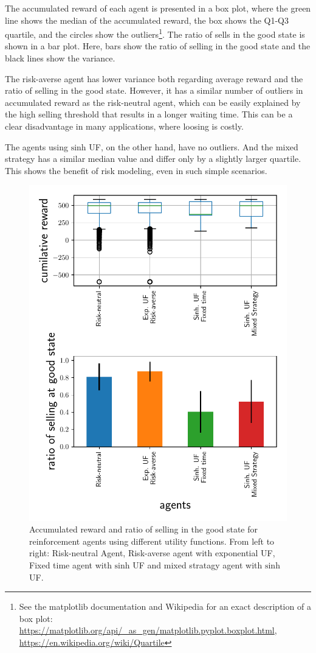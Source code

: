The accumulated reward of each agent is presented in a box plot, where the green line shows the median of the accumulated reward, the box shows the Q1-Q3 quartile, and the circles show the outliers\footnote{See the matplotlib documentation and Wikipedia for an exact description of a box plot: \url{https://matplotlib.org/api/_as_gen/matplotlib.pyplot.boxplot.html}, \url{https://en.wikipedia.org/wiki/Quartile}}.
The ratio of sells in the good state is shown in a bar plot.
Here, bars show the ratio of selling in the good state and the black lines show the variance.

The risk-averse agent has lower variance both regarding average reward and the ratio of selling in the good state.
However, it has a similar number of outliers in accumulated reward as the risk-neutral agent, which can be easily explained by the high selling threshold that results in a longer waiting time.
This can be a clear disadvantage in many applications, where loosing is costly.

The agents using $\text{sinh}$ UF, on the other hand, have no outliers. And the mixed strategy has a similar median value and differ only by a slightly larger quartile.
This shows the benefit of risk modeling, even in such simple scenarios.

\begin{figure}[h]
    \centering
    \includegraphics[width=0.99\linewidth]{img/performance.pdf}
    \caption{Accumulated reward and ratio of selling in the good state for reinforcement agents using different utility functions. From left to right: Risk-neutral Agent, Risk-averse agent with exponential UF, Fixed time agent with $\text{sinh}$ UF and mixed stratagy agent with $\text{sinh}$ UF. }\label{fig:perf}
\end{figure}
